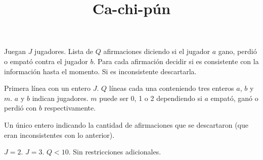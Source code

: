 \documentclass{oci}
\title{Ca-chi-pún}
\begin{document}
\begin{problemDescription}
  Juegan $J$ jugadores.
  Lista de $Q$ afirmaciones diciendo si el jugador $a$ gano, perdió o empató
  contra el jugador $b$.
  Para cada afirmación decidir si es consistente con la información hasta el momento.
  Si es inconsistente descartarla.
\end{problemDescription}

\begin{inputDescription}
  Primera línea con un entero $J$.
  $Q$ líneas cada una conteniendo tres enteros $a$, $b$ y $m$.
  $a$ y $b$ indican jugadores.
  $m$ puede ser 0, 1 o 2 dependiendo si $a$ empató, ganó o perdió con $b$ respectivamente.
\end{inputDescription}

\begin{outputDescription}
  Un único entero indicando la cantidad de afirmaciones que se descartaron (que
  eran inconsistentes con lo anterior).
\end{outputDescription}

\begin{scoreDescription}
   $J=2$.
   $J=3$.
   $Q<10$.
   Sin restricciones adicionales.
\end{scoreDescription}

\begin{sampleDescription}
\end{sampleDescription}
\end{document}
